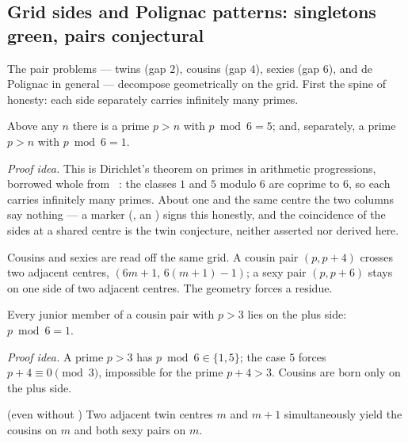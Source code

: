 \subsection{Grid sides and Polignac patterns: singletons green, pairs conjectural}

The pair problems --- twins (gap $2$), cousins (gap $4$), sexies (gap $6$), and de Polignac in
general --- decompose geometrically on the grid. First the spine of honesty: each side
separately carries infinitely many primes.

\begin{theorem}\label{thm:minusSide_primes_unbounded}
\green{}\; Above any $n$ there is a prime $p>n$ with $p\bmod 6 = 5$; and, separately, a prime
$p>n$ with $p\bmod 6 = 1$. 
\end{theorem}

\emph{Proof idea.} This is Dirichlet's theorem on primes in arithmetic progressions, borrowed
whole from ~\cite{mathlib}: the classes $1$ and $5$ modulo $6$ are coprime to
$6$, so each carries infinitely many primes. About one and the same centre the two columns say
nothing --- a marker (\green{}, an ) signs this honestly, and the
coincidence of the sides at a shared centre is the twin conjecture, neither asserted nor
derived here.

Cousins and sexies are read off the same grid. A cousin pair $(p,p+4)$ crosses two adjacent
centres, $(6m+1,\,6(m+1)-1)$; a sexy pair $(p,p+6)$ stays on one side of two adjacent centres.
The geometry forces a residue.

\begin{theorem}\label{thm:cousin_mod_six}
\green{}\; Every junior member of a cousin pair with $p>3$ lies on the plus side:
$p\bmod 6 = 1$. 
\end{theorem}

\emph{Proof idea.} A prime $p>3$ has $p\bmod 6\in\{1,5\}$; the case $5$ forces $p+4\equiv 0
\pmod 3$, impossible for the prime $p+4>3$. Cousins are born only on the plus side.

\begin{theorem}\label{thm:constellation_of_adjacent_twinCenters}
\green{} (even without )\; Two adjacent twin centres $m$ and $m+1$
simultaneously yield the cousins on $m$ and both sexy pairs on $m$.
\end{theorem}

